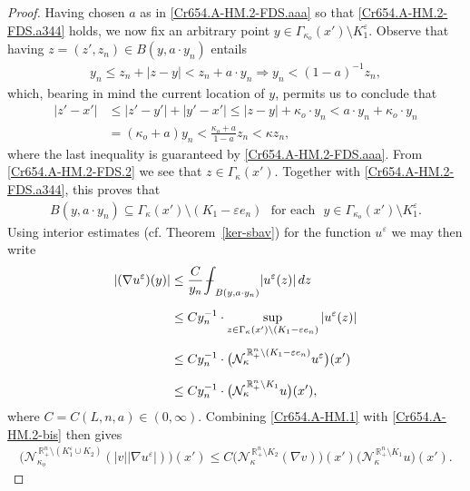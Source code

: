 \documentclass[11pt,reqno]{amsart}
\newcommand{\meanint}{{\int{\mkern-19mu}-}}
\numberwithin{equation}{section}
\theoremstyle{remark}
\begin{document}
\begin{proof}
Having chosen $a$ as in \eqref{Cr654.A-HM.2-FDS.aaa} so that \eqref{Cr654.A-HM.2-FDS.a344} holds, we now fix an arbitrary point 
$y\in\Gamma_{\kappa_o}(x')\setminus K_1^\varepsilon$. Observe that having $z=(z',z_n)\in B(y,a\cdot y_n)$ entails 
%
\begin{align}\label{Cr654.A-HM.2-FDS.1}
y_n\leq z_n+|z-y|<z_n+a\cdot y_n\Longrightarrow y_n<(1-a)^{-1}z_n,
\end{align}
%
which, bearing in mind the current location of $y$, permits us to conclude that  
%
\begin{align}\label{Cr654.A-HM.2-FDS.2}
|z'-x'| &\leq|z'-y'|+|y'-x'|\leq|z-y|+\kappa_o\cdot y_n<a\cdot y_n+\kappa_o\cdot y_n
\nonumber\\[6pt]
&=(\kappa_o+a)y_n<\frac{\kappa_o+a}{1-a}z_n<\kappa z_n,
\end{align}
%
where the last inequality is guaranteed by \eqref{Cr654.A-HM.2-FDS.aaa}.
From \eqref{Cr654.A-HM.2-FDS.2} we see that $z\in\Gamma_{\kappa}(x')$.
Together with \eqref{Cr654.A-HM.2-FDS.a344}, this proves that 
%
\begin{align}\label{Cr654.A-HM.2-FDS.a344.ag}
B(y,a\cdot y_n)\subseteq\Gamma_{\kappa}(x')\setminus(K_1-\varepsilon e_n)\,\,\text{ for each }\,\,
y\in\Gamma_{\kappa_o}(x')\setminus K_1^\varepsilon.
\end{align}
%
Using interior estimates (cf. Theorem~\ref{ker-sbav}) for the function $u^\varepsilon$ we may then write 
%
\begin{align}\label{Cr654.A-HM.2-bis}
|(\nabla u^\varepsilon)(y)| &\leq\frac{C}{y_n}\meanint_{B(y,a\cdot y_n)}|u^\varepsilon(z)|\,dz
\nonumber\\[6pt]
&\leq Cy_n^{-1}\cdot
\sup_{z\in\Gamma_{\kappa}(x')\setminus(K_1-\varepsilon e_n)}|u^\varepsilon(z)|
\nonumber\\[6pt]
&\leq Cy_n^{-1}\cdot\big({\mathcal{N}}_{\kappa}^{\,\mathbb{R}^{n}_{+}\setminus (K_1-\varepsilon e_n)}u^\varepsilon\big)(x')
\nonumber\\[6pt]
&\leq Cy_n^{-1}\cdot\big({\mathcal{N}}_{\kappa}^{\,\mathbb{R}^{n}_{+}\setminus K_1}u\big)(x'),
\end{align}
%
where $C=C(L,n,a)\in(0,\infty)$. Combining \eqref{Cr654.A-HM.1} with \eqref{Cr654.A-HM.2-bis} then gives
%
\begin{align}\label{Cr654.A-HM.2-b22}
\big({\mathcal{N}}^{\,\mathbb{R}^{n}_{+}\setminus (K_1^\varepsilon\cup K_2)}_{\kappa_o}
(|v||\nabla u^\varepsilon|)\big)(x')
\leq C\big({\mathcal{N}}^{\,\mathbb{R}^{n}_{+}\setminus K_2}_{\kappa}(\nabla v)\big)(x')
\big({\mathcal{N}}^{\,\mathbb{R}^{n}_{+}\setminus K_1}_{\kappa}u\big)(x').

\end{align}
\end{proof}
\end{document}
